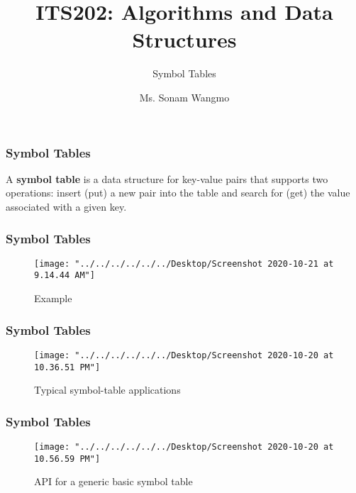 \documentclass[11pt]{beamer}
\begin{document}
	\author{Ms. Sonam Wangmo}
	\title{ITS202: Algorithms and Data Structures}
	\subtitle{Symbol Tables}
	\institute{
		\textcolor{blue}{Gyalpozhing College of Information Technology \\ Royal University of Bhutan} \\
		\vspace{0.5cm}
	}
	\begin{frame}[plain]
		\maketitle
	\end{frame}
	\begin{frame}
		\frametitle{Symbol Tables}
			A \textbf{symbol table} is a data structure for key-value pairs that supports two operations: insert (put) a new pair into the table and search for (get) the value associated with a given key.\\ 
	\end{frame}

\begin{frame}
	\frametitle{Symbol Tables}
	\begin{figure}
		\centering
		\texttt{[image: "../../../../../../Desktop/Screenshot 2020-10-21 at 9.14.44 AM"]}
		\caption{Example}
		\label{fig:screenshot-2020-10-21-at-9}
	\end{figure}	
\end{frame}

\begin{frame}
	\frametitle{Symbol Tables}
	 \begin{figure}
	 	\centering
	 	\texttt{[image: "../../../../../../Desktop/Screenshot 2020-10-20 at 10.36.51 PM"]}
	 	\caption{Typical symbol-table applications}
	 	\label{fig:screenshot-2020-10-20-at-10}
	 \end{figure}
	 
\end{frame}

\begin{frame}
	\frametitle{Symbol Tables}
	\begin{figure}
		\centering
		\texttt{[image: "../../../../../../Desktop/Screenshot 2020-10-20 at 10.56.59 PM"]}
		\caption{API for a generic basic symbol table}
		\label{fig:screenshot-2020-10-20-at-10}
	\end{figure}	
\end{frame}
\end{document}
